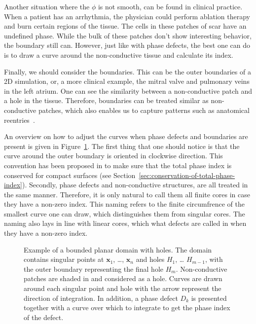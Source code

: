 \documentclass[twocolumn]{article}
\begin{document}
Another situation where the $\phi$ is not smooth,
can be found in clinical practice.
When a patient has an arrhythmia,
the physician could perform ablation therapy
and burn  certain regions of the tissue.
The cells in these patches of scar have an undefined phase.
While the bulk of these patches don't show interesting behavior,
the boundary still can.
However, just like with phase defects,
the best one can do is to draw a curve around the non-conductive tissue
and calculate its index.

Finally, we should consider the boundaries.
This can be the outer boundaries of a 2D simulation,
or, a more clinical example, the mitral valve and pulmonary veins in the left atrium.
One can see the similarity between a non-conductive patch
and a hole in the tissue.
Therefore, boundaries can be treated similar as non-conductive patches,
which also enables us to capture patterns such as anatomical reentries~\autocite{duytschaever2024atrial}.

An overview on how to adjust the curves when phase defects and boundaries are present
is given in Figure~\ref{fig:index_calculation}.
The first thing that one should notice is
that the curve around the outer boundary is oriented in clockwise direction.
This convention has been proposed in \textcite{davidsen2004topological} to make sure
that the total phase index is conserved for compact surfaces (see Section~\ref{sec:conservation-of-total-phase-index}).
Secondly, phase defects and non-conductive structures, 
are all treated in the same manner.
Therefore, it is only natural to call them all finite cores in case they have a non-zero index.
This naming refers to the finite circumfrence of the smallest curve one can draw,
which distinguishes them from singular cores.
The naming also lays in line with linear cores, which what defects are called in \textcite{arno2021a}
when they have a non-zero index.

\begin{figure}[ht]
  \centering
  \caption{Example of a bounded planar domain with holes. The domain
    contains singular points at \(\pmb{x}_1\), \ldots, \(\pmb{x}_n\) and
    holes \(H_1\), \ldots{} \(H_{m-1}\), with the outer boundary
    representing the final hole \(H_m\).
    Non-conductive patches are shaded in and considered as a hole.
    Curves are drawn around each singular point and hole
    with the arrow represent the direction of integration.
    In addition, a phase defect $D_k$ is presented
    together with a curve over which to integrate to get the phase index of the defect.
  }
  \label{fig:index_calculation}
\end{figure}
\end{document}

